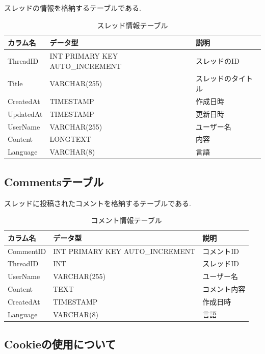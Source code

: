 \documentclass[b5paper,12pt,dvipdfmx]{jsreport}
\begin{document}
スレッドの情報を格納するテーブルである.

\begin{table}[H]
    \centering
    \caption{スレッド情報テーブル}
    \begin{tabular}{|l|l|l|}
        \hline
        \textbf{カラム名} & \textbf{データ型} & \textbf{説明} \\
        \hline
        ThreadID   & INT PRIMARY KEY AUTO\_INCREMENT & スレッドのID \\
        Title      & VARCHAR(255) & スレッドのタイトル \\
        CreatedAt  & TIMESTAMP & 作成日時 \\
        UpdatedAt  & TIMESTAMP & 更新日時 \\
        UserName   & VARCHAR(255) & ユーザー名 \\
        Content    & LONGTEXT & 内容 \\
        Language   & VARCHAR(8) & 言語 \\
        \hline
    \end{tabular}
\end{table}

\subsection*{Commentsテーブル}

スレッドに投稿されたコメントを格納するテーブルである.

\begin{table}[H]
    \centering
    \caption{コメント情報テーブル}
    \begin{tabular}{|l|l|l|}
        \hline
        \textbf{カラム名} & \textbf{データ型} & \textbf{説明} \\
        \hline
        CommentID  & INT PRIMARY KEY AUTO\_INCREMENT & コメントID \\
        ThreadID   & INT & スレッドID \\
        UserName   & VARCHAR(255) & ユーザー名 \\
        Content    & TEXT & コメント内容 \\
        CreatedAt  & TIMESTAMP & 作成日時 \\
        Language   & VARCHAR(8) & 言語 \\
        \hline
    \end{tabular}
\end{table}

\subsection*{Cookieの使用について}
\end{document}
